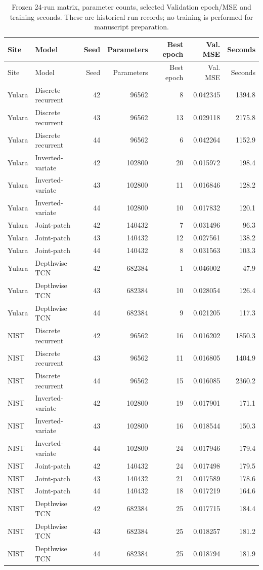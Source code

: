 \begin{longtable}{llrrrrr}
\caption{Frozen 24-run matrix, parameter counts, selected Validation epoch/MSE and training seconds. These are historical run records; no training is performed for manuscript preparation.}\label{tabs:externalruns}\\
\toprule Site & Model & Seed & Parameters & Best epoch & Val. MSE & Seconds\\\midrule
\endfirsthead\toprule Site & Model & Seed & Parameters & Best epoch & Val. MSE & Seconds\\\midrule\endhead
Yulara & Discrete recurrent & 42 & 96562 & 8 & 0.042345 & 1394.8\\
Yulara & Discrete recurrent & 43 & 96562 & 13 & 0.029118 & 2175.8\\
Yulara & Discrete recurrent & 44 & 96562 & 6 & 0.042264 & 1152.9\\
Yulara & Inverted-variate & 42 & 102800 & 20 & 0.015972 & 198.4\\
Yulara & Inverted-variate & 43 & 102800 & 11 & 0.016846 & 128.2\\
Yulara & Inverted-variate & 44 & 102800 & 10 & 0.017832 & 120.1\\
Yulara & Joint-patch & 42 & 140432 & 7 & 0.031496 & 96.3\\
Yulara & Joint-patch & 43 & 140432 & 12 & 0.027561 & 138.2\\
Yulara & Joint-patch & 44 & 140432 & 8 & 0.031563 & 103.3\\
Yulara & Depthwise TCN & 42 & 682384 & 1 & 0.046002 & 47.9\\
Yulara & Depthwise TCN & 43 & 682384 & 10 & 0.028054 & 126.4\\
Yulara & Depthwise TCN & 44 & 682384 & 9 & 0.021205 & 117.3\\
NIST & Discrete recurrent & 42 & 96562 & 16 & 0.016202 & 1850.3\\
NIST & Discrete recurrent & 43 & 96562 & 11 & 0.016805 & 1404.9\\
NIST & Discrete recurrent & 44 & 96562 & 15 & 0.016085 & 2360.2\\
NIST & Inverted-variate & 42 & 102800 & 19 & 0.017901 & 171.1\\
NIST & Inverted-variate & 43 & 102800 & 16 & 0.018544 & 150.3\\
NIST & Inverted-variate & 44 & 102800 & 24 & 0.017946 & 179.4\\
NIST & Joint-patch & 42 & 140432 & 24 & 0.017498 & 179.5\\
NIST & Joint-patch & 43 & 140432 & 21 & 0.017589 & 178.6\\
NIST & Joint-patch & 44 & 140432 & 18 & 0.017219 & 164.6\\
NIST & Depthwise TCN & 42 & 682384 & 25 & 0.017715 & 184.4\\
NIST & Depthwise TCN & 43 & 682384 & 25 & 0.018257 & 181.2\\
NIST & Depthwise TCN & 44 & 682384 & 25 & 0.018794 & 181.9\\
\bottomrule\end{longtable}
